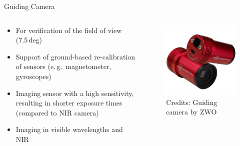\documentclass[11pt, aspectratio=169]{beamer}
\begin{document}
\begin{frame}{Guiding Camera}
    \begin{columns}[t]
    \begin{column}{0.6\textwidth}
    \begin{itemize}
        \item For verification of the field of view (7.5\,deg)
        \item Support of ground-based re-calibration of sensors (e.\,g.~magnetometer, gyroscopes)
        \item Imaging sensor with a high sensitivity, resulting in shorter exposure times (compared to NIR camera)
        \item Imaging in visible wavelengths and NIR
    \end{itemize}

    \end{column}
    \begin{column}{0.4\textwidth}
        \begin{figure}[t]
            \centering
            \includegraphics[width=0.7\linewidth]{figures/images/ZWO_ASI290MM_Mini.jpg}
            \caption*{Credits: Guiding camera by ZWO}
            \label{fig::guiding_camera}
        \end{figure}
    \end{column}
    \end{columns}
\end{frame}
\end{document}

